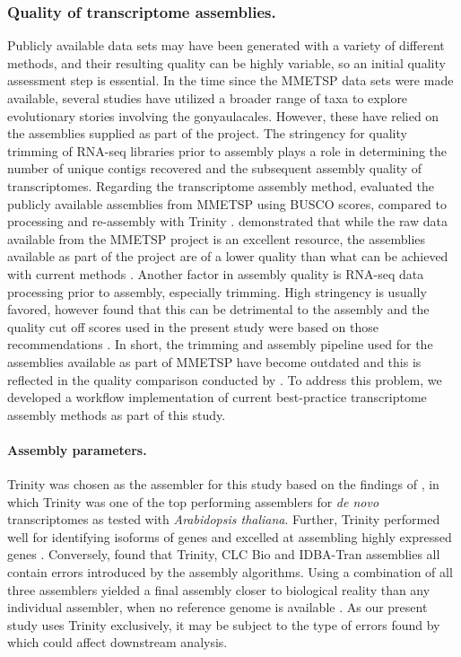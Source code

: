 \documentclass[fleqn,10pt,lineno]{wlpeerj} %
\begin{document}
\subsubsection*{Quality of transcriptome assemblies.}
Publicly available data sets may have been generated with a variety of different methods, and their resulting quality can be highly variable, so an initial quality assessment step is essential. 
In the time since the MMETSP data sets were made available, several studies have utilized a broader range of taxa to explore evolutionary stories involving the gonyaulacales. 
However, these have relied on the assemblies supplied as part of the project. 
The stringency for quality trimming of RNA-seq libraries prior to assembly plays a role in determining the number of unique contigs recovered and the subsequent assembly quality of transcriptomes. 
Regarding the transcriptome assembly method, \cite{cohen2018mmetsp} evaluated the publicly available assemblies from MMETSP using BUSCO scores, compared to processing and re-assembly with Trinity \citep{cohen2018mmetsp}. 
\cite{cohen2018mmetsp} demonstrated that while the raw data available from the MMETSP project is an excellent resource, the assemblies available as part of the project are of a lower quality than what can be achieved with current methods \citep{cohen2018mmetsp}. 
Another factor in assembly quality is RNA-seq data processing prior to assembly, especially trimming. 
High stringency is usually favored, however \cite{macmanes2014optimal} found that this can be detrimental to the assembly and the quality cut off scores used in the present study were based on those recommendations \citep{macmanes2014optimal}.
In short, the trimming and assembly pipeline used for the assemblies available as part of MMETSP have become outdated and this is reflected in the quality comparison conducted by \cite{cohen2018mmetsp}.
To address this problem, we developed a workflow implementation of current best-practice transcriptome assembly methods as part of this study.
\paragraph*{Assembly parameters.}
Trinity was chosen as the assembler for this study based on the findings of \cite{honaas2016selecting}, in which Trinity was one of the top performing assemblers for \textit{de novo} transcriptomes as tested with \textit{Arabidopsis thaliana}. 
Further, Trinity performed well for identifying isoforms of genes and excelled at assembling highly expressed genes \citep{honaas2016selecting}.
Conversely, \cite{cerveau2016combining} found that Trinity, CLC Bio and IDBA-Tran assemblies all contain errors introduced by the assembly algorithms. 
Using a combination of all three assemblers yielded a final assembly closer to biological reality than any individual assembler, when no reference genome is available \citep{cerveau2016combining}.
As our present study uses Trinity exclusively, it may be subject to the type of errors found by \cite{cerveau2016combining} which could affect downstream analysis.
\end{document}
